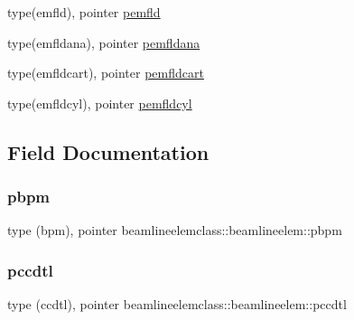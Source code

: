\begin{DoxyCompactItemize}
\item 
type(emfld), pointer \mbox{\hyperlink{structbeamlineelemclass_1_1beamlineelem_a626e5426ee98993dfe2352be10075411}{pemfld}}
\item 
type(emfldana), pointer \mbox{\hyperlink{structbeamlineelemclass_1_1beamlineelem_a9da0a18e62bab91e16cf56935313b210}{pemfldana}}
\item 
type(emfldcart), pointer \mbox{\hyperlink{structbeamlineelemclass_1_1beamlineelem_ae25137b123a2ee3f55fb97372dcae2ae}{pemfldcart}}
\item 
type(emfldcyl), pointer \mbox{\hyperlink{structbeamlineelemclass_1_1beamlineelem_a255e033e63b5b259d76ed6bf738a8cf6}{pemfldcyl}}
\end{DoxyCompactItemize}


\subsection{Field Documentation}
\mbox{\label{structbeamlineelemclass_1_1beamlineelem_ab1486848bf9231eeed15a83170442e32}} 
\subsubsection{\texorpdfstring{pbpm}{pbpm}}
{\footnotesize\ttfamily type (bpm), pointer beamlineelemclass\+::beamlineelem\+::pbpm}

\mbox{\label{structbeamlineelemclass_1_1beamlineelem_afc03034604a05eb1bc374945e4ab176d}} 
\subsubsection{\texorpdfstring{pccdtl}{pccdtl}}
{\footnotesize\ttfamily type (ccdtl), pointer beamlineelemclass\+::beamlineelem\+::pccdtl}

\mbox{\label{structbeamlineelemclass_1_1beamlineelem_ac12416dfd09e0a7195c5297b12c1194f}} 
